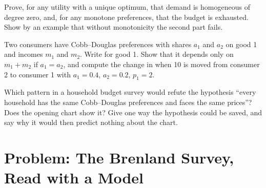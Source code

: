 \begin{exercise}[$\star\star\star$]\label{exo:b1:consumer-choice:prove}
Prove, for any utility with a unique optimum, that demand is homogeneous of
degree zero, and, for any monotone preferences, that the budget is
exhausted. Show by an example that without monotonicity the second part
fails.
\end{exercise}

\begin{exercise}[$\star\star\star$]\label{exo:b1:consumer-choice:aggregate}
Two consumers have Cobb--Douglas preferences with shares $a_1$ and $a_2$ on
good 1 and incomes $m_1$ and $m_2$. Write  for good 1. Show
that it depends only on $m_1 + m_2$ if $a_1 = a_2$, and compute the change in
 when 10 is moved from consumer 2 to consumer 1 with
$a_1 = 0.4$, $a_2 = 0.2$, $p_1 = 2$.
\end{exercise}

\begin{exercise}[$\star\star\star$]\label{exo:b1:consumer-choice:refute}
Which pattern in a household budget survey would refute the hypothesis
``every household has the same Cobb--Douglas preferences and faces the same
prices''? Does the opening chart show it? Give one way the hypothesis could
be saved, and say why it would then predict nothing about the chart.
\end{exercise}

\section{Problem: The Brenland Survey, Read with a Model}\label{sec:b1:consumer-choice:problem}

